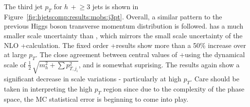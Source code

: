 The third jet $p_T$ for $h\,+\!\ge\!\!3$ jets is shown in
Figure~\ref{fig:hjetscomp:results:mobs:j3pt}. Overall, a similar pattern to the
previous Higgs boson transverse momentum distribution is followed. \Sherpa
\MEPSatNLO has a much smaller scale uncertainty than \MGaMC, which mirrors 
the small scale uncertainty of the NLO \GoSam{}+\Sherpa calculation. The fixed
order \GoSam{}+\Sherpa results show more than a 50\% increase over \Powheg at large
$p_T$.  The close agreement between central values of \GoSam{}+\Sherpa using the
dynamical scale of $\tfrac{1}{2}\,\sqrt{m_{h}^2+\sum p_{T,j_i}^2}$, and \Minlo
is somewhat suprising. The \Minlo results again show a significant decrease in
scale variations - particularly at high $p_T$. Care
should be taken in interpreting the high $p_T$ region since due to the
complexity of the phase space, the MC statistical error is beginning to come into
play.


